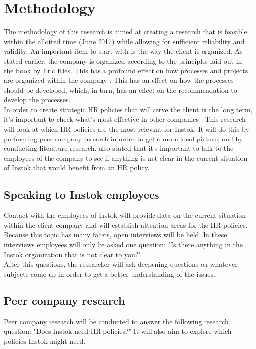 \documentclass[man]{apa6}
\begin{document}
\section{Methodology}
The methodology of this research is aimed at creating a research that is feasible within the allotted time (June 2017) while allowing for sufficient reliability and validity. An important item to start with is the way the client is organized. As stated earlier, the company is organized according to the principles laid out in the book by Eric Ries. This has a profound effect on how processes and projects are organized within the company \parencite{RIES2011}. This has an effect on how the processes should be developed, which, in turn, has an effect on the recommendation to develop the processes.\\
In order to create strategic HR policies that will serve the client in the long term, it's important to check what's most effective in other companies \parencite{SNL2013}. This research will look at which HR policies are the most relevant for Instok. It will do this by performing peer company research in order to get a more local picture, and by conducting literature research. \cite{HRCA2016} also stated that it's important to talk to the employees of the company to see if anything is not clear in the current situation of Instok that would benefit from an HR policy.

\subsection{Speaking to Instok employees}
Contact with the employees of Instok will provide data on the current situation within the client company and will establish attention areas for the HR policies. Because this topic has many facets, open interviews will be held. In these interviews employees will only be asked one question: "Is there anything in the Instok organization that is not clear to you?"\\
After this questions, the researcher will ask deepening questions on whatever subjects come up in order to get a better understanding of the issues.

\subsection{Peer company research}
Peer company research will be conducted to answer the following research question: "Does Instok need HR policies?" It will also aim to explore which policies Instok might need.\\
\end{document}

